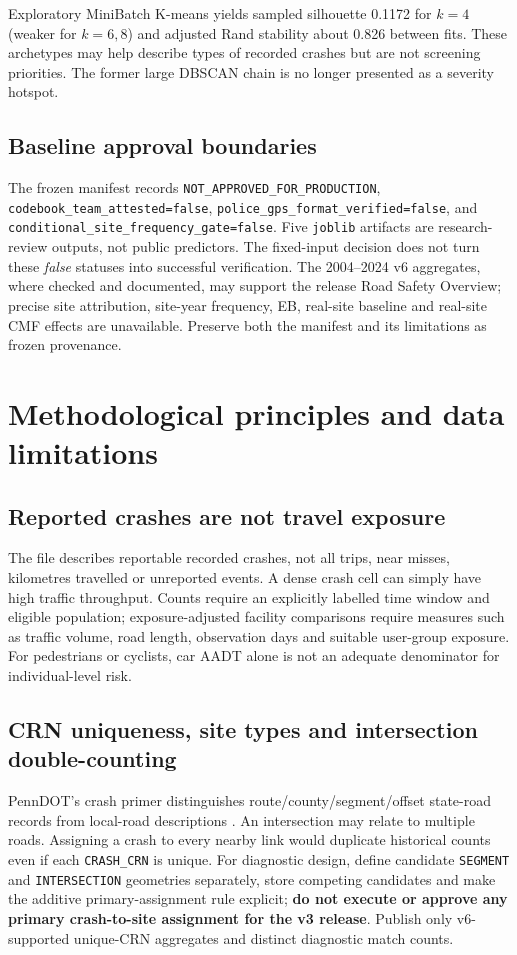 \documentclass[11pt,a4paper,openany]{report}
\newcommand{\pathcode}[1]{\nolinkurl{#1}}
\begin{document}
Exploratory MiniBatch K-means yields sampled silhouette 0.1172 for $k=4$ (weaker for $k=6,8$) and adjusted Rand stability about 0.826 between fits. These archetypes may help describe types of recorded crashes but are not screening priorities. The former large DBSCAN chain is no longer presented as a severity hotspot.

\section{Baseline approval boundaries}
The frozen manifest records \pathcode{NOT_APPROVED_FOR_PRODUCTION}, \pathcode{codebook_team_attested=false}, \pathcode{police_gps_format_verified=false}, and \pathcode{conditional_site_frequency_gate=false}. Five \pathcode{joblib} artifacts are research-review outputs, not public predictors. The fixed-input decision does not turn these \emph{false} statuses into successful verification. The 2004--2024 v6 aggregates, where checked and documented, may support the release Road Safety Overview; precise site attribution, site-year frequency, EB, real-site baseline and real-site CMF effects are unavailable. Preserve both the manifest and its limitations as frozen provenance.

\chapter{Methodological principles and data limitations}
\section{Reported crashes are not travel exposure}
The file describes reportable recorded crashes, not all trips, near misses, kilometres travelled or unreported events. A dense crash cell can simply have high traffic throughput. Counts require an explicitly labelled time window and eligible population; exposure-adjusted facility comparisons require measures such as traffic volume, road length, observation days and suitable user-group exposure. For pedestrians or cyclists, car AADT alone is not an adequate denominator for individual-level risk.

\section{CRN uniqueness, site types and intersection double-counting}
PennDOT's crash primer distinguishes route/county/segment/offset state-road records from local-road descriptions \cite{Primer}. An intersection may relate to multiple roads. Assigning a crash to every nearby link would duplicate historical counts even if each \pathcode{CRASH_CRN} is unique. For diagnostic design, define candidate \pathcode{SEGMENT} and \pathcode{INTERSECTION} geometries separately, store competing candidates and make the additive primary-assignment rule explicit; \textbf{do not execute or approve any primary crash-to-site assignment for the v3 release}. Publish only v6-supported unique-CRN aggregates and distinct diagnostic match counts.
\end{document}
